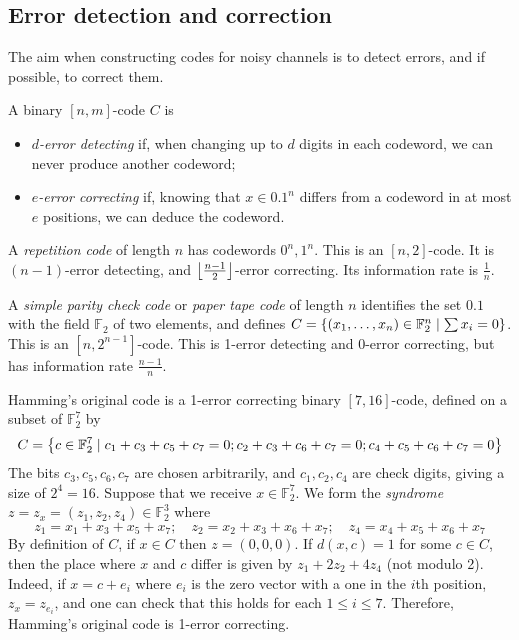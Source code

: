 \subsection{Error detection and correction}
The aim when constructing codes for noisy channels is to detect errors, and if possible, to correct them.
\begin{definition}
    A binary \( [n,m] \)-code \( C \) is
    \begin{itemize}
        \item \emph{\( d \)-error detecting} if, when changing up to \( d \) digits in each codeword, we can never produce another codeword;
        \item \emph{\( e \)-error correcting} if, knowing that \( x \in \qty{0,1}^n \) differs from a codeword in at most \( e \) positions, we can deduce the codeword.
    \end{itemize}
\end{definition}
\begin{example}
    A \emph{repetition code} of length \( n \) has codewords \( 0^n, 1^n \).
    This is an \( [n,2] \)-code.
    It is \( (n-1) \)-error detecting, and \( \floor*{\frac{n-1}{2}} \)-error correcting.
    Its information rate is \( \frac{1}{n} \).
\end{example}
\begin{example}
    A \emph{simple parity check code} or \emph{paper tape code} of length \( n \) identifies the set \( \qty{0,1} \) with the field \( \mathbb F_2 \) of two elements, and defines \( C = \qty{(x_1, \dots, x_n) \in \mathbb F_2^n \mid \sum x_i = 0} \).
    This is an \( [n,2^{n-1}] \)-code.
    This is 1-error detecting and 0-error correcting, but has information rate \( \frac{n-1}{n} \).
\end{example}
\begin{example}
    Hamming's original code is a 1-error correcting binary \( [7,16] \)-code, defined on a subset of \( \mathbb F_2^7 \) by
    \[ C = \qty{c \in \mathbb F_2^7 \mid c_1 + c_3 + c_5 + c_7 = 0; c_2 + c_3 + c_6 + c_7 = 0; c_4 + c_5 + c_6 + c_7 = 0} \]
    The bits \( c_3, c_5, c_6, c_7 \) are chosen arbitrarily, and \( c_1, c_2, c_4 \) are check digits, giving a size of \( 2^4 = 16 \).
    Suppose that we receive \( x \in \mathbb F_2^7 \).
    We form the \emph{syndrome} \( z = z_x = (z_1, z_2, z_4) \in \mathbb F_2^3 \) where
    \[ z_1 = x_1 + x_3 + x_5 + x_7;\quad z_2 = x_2 + x_3 + x_6 + x_7;\quad z_4 = x_4 + x_5 + x_6 + x_7 \]
    By definition of \( C \), if \( x \in C \) then \( z = (0, 0, 0) \).
    If \( d(x,c) = 1 \) for some \( c \in C \), then the place where \( x \) and \( c \) differ is given by \( z_1 + 2z_2 + 4z_4 \) (not modulo 2).
    Indeed, if \( x = c + e_i \) where \( e_i \) is the zero vector with a one in the \( i \)th position, \( z_x = z_{e_i} \), and one can check that this holds for each \( 1 \leq i \leq 7 \).
    Therefore, Hamming's original code is 1-error correcting.
\end{example}
